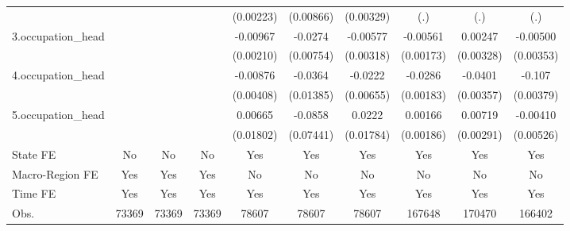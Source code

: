 \begin{table}[htbp]
\begin{tabular}{l*{9}{c}}
            &                     &                     &                     &   (0.00223)         &   (0.00866)         &   (0.00329)         &         (.)         &         (.)         &         (.)         \\
3.occupation\_head&                     &                     &                     &    -0.00967\sym{***}&     -0.0274\sym{***}&    -0.00577\sym{*}  &    -0.00561\sym{***}&     0.00247         &    -0.00500         \\
            &                     &                     &                     &   (0.00210)         &   (0.00754)         &   (0.00318)         &   (0.00173)         &   (0.00328)         &   (0.00353)         \\
4.occupation\_head&                     &                     &                     &    -0.00876\sym{**} &     -0.0364\sym{***}&     -0.0222\sym{***}&     -0.0286\sym{***}&     -0.0401\sym{***}&      -0.107\sym{***}\\
            &                     &                     &                     &   (0.00408)         &   (0.01385)         &   (0.00655)         &   (0.00183)         &   (0.00357)         &   (0.00379)         \\
5.occupation\_head&                     &                     &                     &     0.00665         &     -0.0858         &      0.0222         &     0.00166         &     0.00719\sym{**} &    -0.00410         \\
            &                     &                     &                     &   (0.01802)         &   (0.07441)         &   (0.01784)         &   (0.00186)         &   (0.00291)         &   (0.00526)         \\
State FE    &          No         &          No         &          No         &         Yes         &         Yes         &         Yes         &         Yes         &         Yes         &         Yes         \\
Macro-Region FE &         Yes         &         Yes         &         Yes         &          No         &          No         &          No         &          No         &          No         &          No         \\
Time FE     &         Yes         &         Yes         &         Yes         &         Yes         &         Yes         &         Yes         &         Yes         &         Yes         &         Yes         \\
\hline
Obs.        &       73369         &       73369         &       73369         &       78607         &       78607         &       78607         &      167648         &      170470         &      166402         \\

\end{tabular}
\end{table}
